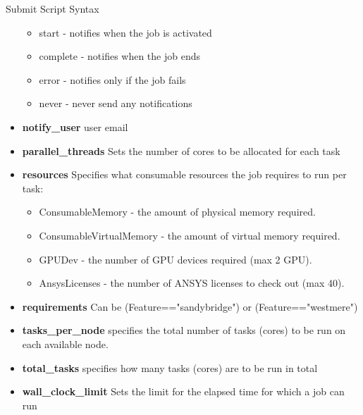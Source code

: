 \documentclass[final,t]{beamer}
\begin{document}
\begin{frame}[fragile]{}
\begin{columns}[t]
\begin{column}{.3\linewidth}
\begin{block}{Submit Script Syntax}
\begin{itemize}
\begin{itemize}
            \item start - notifies when the job is activated
            \item complete - notifies when the job ends
            \item error - notifies only if the job fails
            \item never - never send any notifications
        \end{itemize}
        \item \textbf{notify\_user} user email
        \item \textbf{parallel\_threads} Sets the number of cores to be allocated for each task
        \item \textbf{resources} Specifies what consumable resources the job requires to run per task:
        \begin{itemize}
            \item ConsumableMemory - the amount of physical memory required. 
            \item ConsumableVirtualMemory - the amount of virtual memory required.
            \item GPUDev - the number of GPU devices required (max 2 GPU).
            \item AnsysLicenses - the number of ANSYS licenses to check out (max 40).
        \end{itemize}
        \item \textbf{requirements} Can be (Feature=="sandybridge") or (Feature=="westmere")
        \item \textbf{tasks\_per\_node} specifies the total number of tasks (cores) to be run on each available node.
        \item \textbf{total\_tasks} specifies how many tasks (cores) are to be run in total
        \item \textbf{wall\_clock\_limit} Sets the limit for the elapsed time for which a job can run
        \end{itemize}
      \end{block}



\end{column}
\end{columns}
\end{frame}
\end{document}
